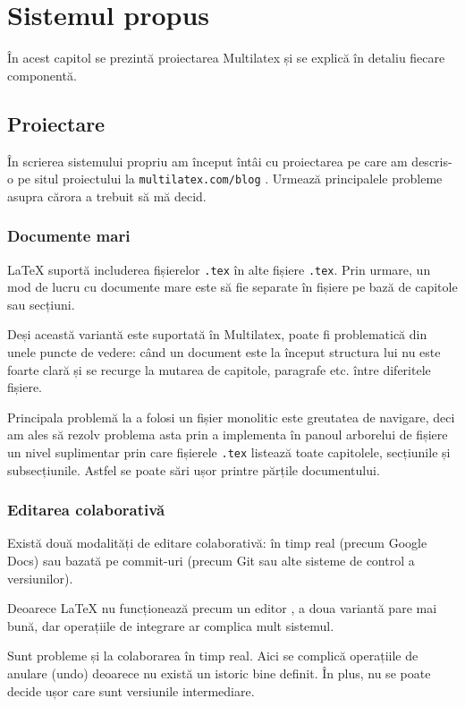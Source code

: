 \documentclass[a4wide,12pt]{report}
\newcommand{\eng}[1]{{#1}} %
\newcommand{\cod}[1]{\texttt{#1}}
\newcommand{\acr}[1]{{\textsmaller[1]{\textsc{#1}}}} %
\begin{document}
\chapter{Sistemul propus}

În acest capitol se prezintă proiectarea Multilatex și se explică în detaliu
fiecare componentă.

\section{Proiectare}

În scrierea sistemului propriu am început întâi cu proiectarea pe care am
descris-o pe situl proiectului la \cod{multilatex.com/blog} . Urmează
principalele probleme asupra cărora a trebuit să mă decid.

\subsection{Documente mari}

\LaTeX{} suportă includerea fișierelor \cod{.tex} în alte fișiere \cod{.tex}.
Prin urmare, un mod de lucru cu documente mare este să fie separate în fișiere
pe bază de capitole sau secțiuni.

Deși această variantă este suportată în Multilatex, poate fi problematică din
unele puncte de vedere: când un document este la început structura lui nu este
foarte clară și se recurge la mutarea de capitole, paragrafe etc. între
diferitele fișiere.

Principala problemă la a folosi un fișier monolitic este greutatea de navigare,
deci am ales să rezolv problema asta prin a implementa în panoul arborelui de
fișiere un nivel suplimentar prin care fișierele \cod{.tex} listează toate
capitolele, secțiunile și subsecțiunile. Astfel se poate sări ușor printre
părțile documentului.

\subsection{Editarea colaborativă}

Există două modalități de editare colaborativă: în timp real (precum Google
Docs) sau bazată pe commit-uri (precum Git sau alte sisteme de control a
versiunilor).

Deoarece \LaTeX{} nu funcționează precum un editor \acr{WYSIWYG}, a doua
variantă pare mai bună, dar operațiile de integrare ar complica mult sistemul.

Sunt probleme și la colaborarea în timp real. Aici se complică operațiile de
anulare (\eng{undo}) deoarece nu există un istoric bine definit. În plus, nu se
poate decide ușor care sunt versiunile intermediare.
\end{document}
